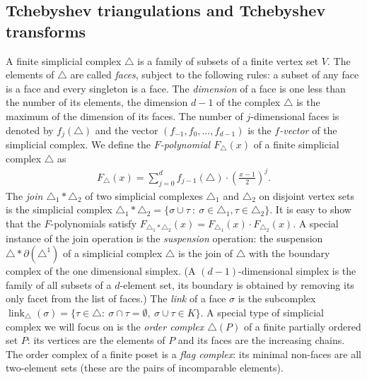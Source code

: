 \documentclass[reqno,12pt]{amsart}
\numberwithin{equation}{section}
\DeclareMathOperator{\link}{link}
\newcommand{\0}{\widehat{0}}
\newcommand{\1}{\widehat{1}}
\newcommand{\2}{\widehat{2}}
\begin{document}
\subsection{Tchebyshev triangulations and Tchebyshev transforms}

A finite simplicial complex $\triangle$ is a family of subsets of a
finite vertex set $V$. The elements of $\triangle$ are called {\em
  faces}, subject to the following rules: a subset of any face is a face
and every singleton is a face. The {\em dimension} of a face is one less than
the number of its elements, the dimension $d-1$ of the
complex $\triangle$ is the maximum of the dimension of its faces. The
number of $j$-dimensional faces is denoted by $f_j(\triangle)$ and the
vector $(f_{-1}, f_0,\ldots,f_{d-1})$ is the {\em $f$-vector} of the
simplicial complex. We define the {\em $F$-polynomial $F_{\triangle}(x)$
} of a finite simplicial complex $\triangle$ as
\begin{align}
F_{\triangle}(x)=\sum_{j=0}^{d} f_{j-1}(\triangle)\cdot
\left(\frac{x-1}{2}\right)^j. 
\end{align}
The {\em join $\triangle_1*\triangle_2$} of two simplicial
complexes $\triangle_1$ and $\triangle_2$ on disjoint vertex sets is the
simplicial complex  
$\triangle_1*\triangle_2=\{\sigma\cup\tau\::\: \sigma\in\triangle_1,
\tau\in\triangle_2\}$. It is easy to show that the $F$-polynomials
satisfy $F_{\triangle_1*\triangle_2}(x)=F_{\triangle_1}(x)\cdot
F_{\triangle_2}(x)$. A special instance of the join operation is the
{\em suspension} operation: the suspension $\triangle*\partial(\triangle^1)$ 
of a simplicial complex $\triangle$ is the join of $\triangle$ with the
boundary complex of the one dimensional simplex. (A $(d-1)$-dimensional
simplex is the family of all subsets of a $d$-element set, its boundary
is obtained by removing its only facet from the list of faces.)
The {\em link} of a face $\sigma$
is the subcomplex $\link_{\triangle}(\sigma)=\{\tau\in \triangle:\ 
\sigma\cap \tau=\emptyset, \ \sigma\cup \tau\in K\}$. A special type of
simplicial complex we will focus on is the {\em order complex
  $\triangle(P)$} of a finite partially ordered set $P$: its vertices
are the elements of $P$ and its faces are the increasing chains. The
order complex of a finite poset is a {\em flag complex}: its minimal
non-faces are all two-element sets (these are the pairs of incomparable
elements). 
\end{document}
